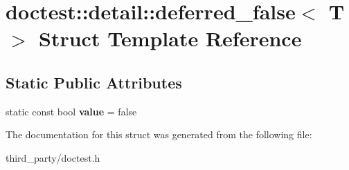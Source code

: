 \hypertarget{structdoctest_1_1detail_1_1deferred__false}{}\section{doctest\+::detail\+::deferred\+\_\+false$<$ T $>$ Struct Template Reference}
\label{structdoctest_1_1detail_1_1deferred__false}
\subsection*{Static Public Attributes}
\begin{DoxyCompactItemize}
\item 
\mbox{\label{structdoctest_1_1detail_1_1deferred__false_abc8eec7a8439ab592f76068cb408d106}} 
static const bool {\bfseries value} = false
\end{DoxyCompactItemize}


The documentation for this struct was generated from the following file\+:\begin{DoxyCompactItemize}
\item 
third\+\_\+party/doctest.\+h\end{DoxyCompactItemize}

